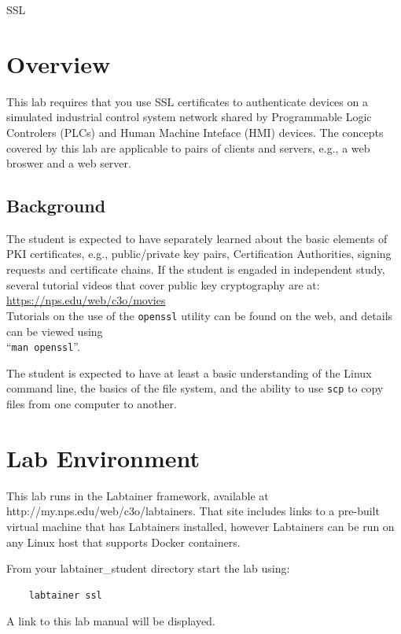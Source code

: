 


\begin{center}
{\LARGE SSL}
\vspace{0.1in}\\
\end{center}

\copyrightnotice

\section{Overview}
This lab requires that you use SSL certificates to authenticate devices
on a simulated industrial control system network shared by 
Programmable Logic Controlers (PLCs) and Human Machine Inteface (HMI) devices.
The concepts covered by this lab are applicable to pairs of clients and servers,
e.g., a web broswer and a web server.

\subsection {Background}
The student is expected to have separately learned about the basic elements of PKI 
certificates, e.g., public/private key pairs, Certification Authorities, 
signing requests and certificate chains.  If the student is engaded in independent
study, several tutorial videos that cover public key cryptography are at:\\
\url{https://nps.edu/web/c3o/movies} \\
Tutorials on the use of the {\tt openssl} utility can be found on the web, and details
can be viewed using \\
``{\tt man openssl}''.

The student is expected to have at least a basic understanding of the Linux command line,
the basics of the file system, and the ability to use {\tt scp} to copy files from
one computer to another.

\section{Lab Environment}
This lab runs in the Labtainer framework,
available at http://my.nps.edu/web/c3o/labtainers.
That site includes links to a pre-built virtual machine
that has Labtainers installed, however Labtainers can
be run on any Linux host that supports Docker containers.

From your labtainer_student directory start the lab using:
\begin{verbatim}
    labtainer ssl
\end{verbatim}
\noindent A link to this lab manual will be displayed.  

